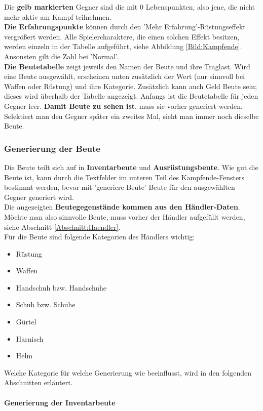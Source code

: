 \documentclass[11pt, a4paper, german]{article}
\begin{document}
Die \textbf{gelb markierten} Gegner sind die mit 0 Lebenspunkten, also jene, die nicht mehr aktiv am Kampf teilnehmen.\\

\textbf{Die Erfahrungspunkte} können durch den 'Mehr Erfahrung'-Rüstungseffekt vergrößert werden. Alle Spielercharaktere, die einen solchen Effekt besitzen, werden einzeln in der Tabelle aufgeführt, siehe Abbildung \ref{Bild:Kampfende}. Ansonsten gilt die Zahl bei 'Normal'.\\

\textbf{Die Beutetabelle} zeigt jeweils den Namen der Beute und ihre Traglast. Wird eine Beute ausgewählt, erscheinen unten zusätzlich der Wert (nur sinnvoll bei Waffen oder Rüstung) und ihre Kategorie. Zusätzlich kann auch Geld Beute sein; dieses wird überhalb der Tabelle angezeigt. Anfangs ist die Beutetabelle für jeden Gegner leer. \textbf{Damit Beute zu sehen ist}, muss sie vorher generiert werden. Selektiert man den Gegner später ein zweites Mal, sieht man immer noch dieselbe Beute.

\subsubsection{Generierung der Beute}\label{Abschnitt:Beute}
Die Beute teilt sich auf in \textbf{Inventarbeute} und \textbf{Ausrüstungsbeute}. Wie gut die Beute ist, kann durch die Textfelder im unteren Teil des Kampfende-Fensters bestimmt werden, bevor mit 'generiere Beute' Beute für den ausgewählten Gegner generiert wird.\\

Die angezeigten \textbf{Beutegegenstände kommen aus den Händler-Daten}. Möchte man also sinnvolle Beute, muss vorher der Händler aufgefüllt werden, siehe Abschnitt \ref{Abschnitt:Haendler}.\\

Für die Beute sind folgende Kategorien des Händlers wichtig: \begin{itemize}
\item Rüstung
\item Waffen
\item Handschuh bzw. Handschuhe
\item Schuh bzw. Schuhe
\item Gürtel
\item Harnisch
\item Helm
\end{itemize}
Welche Kategorie für welche Generierung wie beeinflusst, wird in den folgenden Abschnitten erläutert.\\ \\
\textbf{Generierung der Inventarbeute}\\
\end{document}
